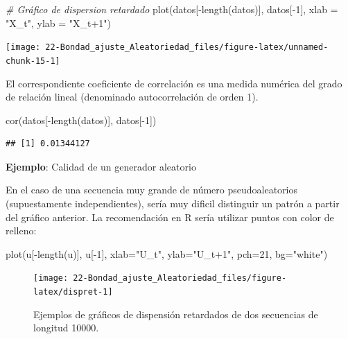 \documentclass[
]{book}
\newenvironment{Shaded}{\begin{snugshade}}{\end{snugshade}}
\newcommand{\AttributeTok}[1]{\textcolor[rgb]{0.77,0.63,0.00}{#1}}
\newcommand{\CommentTok}[1]{\textcolor[rgb]{0.56,0.35,0.01}{\textit{#1}}}
\newcommand{\DecValTok}[1]{\textcolor[rgb]{0.00,0.00,0.81}{#1}}
\newcommand{\FunctionTok}[1]{\textcolor[rgb]{0.00,0.00,0.00}{#1}}
\newcommand{\NormalTok}[1]{#1}
\newcommand{\SpecialCharTok}[1]{\textcolor[rgb]{0.00,0.00,0.00}{#1}}
\newcommand{\StringTok}[1]{\textcolor[rgb]{0.31,0.60,0.02}{#1}}
\theoremstyle{break}
\theoremstyle{definition}
\theoremstyle{definition}
\theoremstyle{definition}
\theoremstyle{definition}
\theoremstyle{remark}
\begin{document}
\begin{Shaded}
\begin{Highlighting}[]
\CommentTok{\# Gráfico de dispersion retardado}
\FunctionTok{plot}\NormalTok{(datos[}\SpecialCharTok{{-}}\FunctionTok{length}\NormalTok{(datos)], datos[}\SpecialCharTok{{-}}\DecValTok{1}\NormalTok{], }\AttributeTok{xlab =} \StringTok{"X\_t"}\NormalTok{, }\AttributeTok{ylab =} \StringTok{"X\_t+1"}\NormalTok{)}
\end{Highlighting}
\end{Shaded}

\begin{center}\texttt{[image: 22-Bondad\_ajuste\_Aleatoriedad\_files/figure-latex/unnamed-chunk-15-1]} \end{center}

El correspondiente coeficiente de correlación es una medida numérica
del grado de relación lineal (denominado autocorrelación de orden 1).

\begin{Shaded}
\begin{Highlighting}[]
\FunctionTok{cor}\NormalTok{(datos[}\SpecialCharTok{{-}}\FunctionTok{length}\NormalTok{(datos)], datos[}\SpecialCharTok{{-}}\DecValTok{1}\NormalTok{])}
\end{Highlighting}
\end{Shaded}

\begin{verbatim}
## [1] 0.01344127
\end{verbatim}

\textbf{Ejemplo}: Calidad de un generador aleatorio

En el caso de una secuencia muy grande de número pseudoaleatorios (supuestamente independientes), sería muy dificil distinguir un patrón a partir del gráfico anterior. La recomendación en R sería utilizar puntos con color de relleno:

\begin{Shaded}
\begin{Highlighting}[]
\FunctionTok{plot}\NormalTok{(u[}\SpecialCharTok{{-}}\FunctionTok{length}\NormalTok{(u)], u[}\SpecialCharTok{{-}}\DecValTok{1}\NormalTok{], }\AttributeTok{xlab=}\StringTok{"U\_t"}\NormalTok{, }\AttributeTok{ylab=}\StringTok{"U\_t+1"}\NormalTok{, }\AttributeTok{pch=}\DecValTok{21}\NormalTok{, }\AttributeTok{bg=}\StringTok{"white"}\NormalTok{)}
\end{Highlighting}
\end{Shaded}

\begin{figure}[!htb]

{\centering \texttt{[image: 22-Bondad\_ajuste\_Aleatoriedad\_files/figure-latex/dispret-1]} 

}

\caption{Ejemplos de gráficos de dispensión retardados de dos secuencias de longitud 10000.}\label{fig:dispret}
\end{figure}
\end{document}
